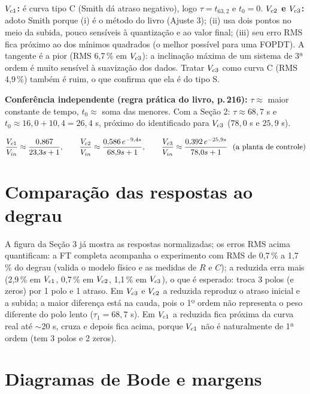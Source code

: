 \begin{just}\textbf{$V_{c1}$:} é curva tipo C (Smith dá atraso negativo), logo $\tau=t_{63,2}$ e $t_0=0$. \textbf{$V_{c2}$ e $V_{c3}$:} adoto Smith porque (i) é o método do livro (Ajuste 3); (ii) usa dois pontos no meio da subida, pouco sensíveis à quantização e ao valor final; (iii) seu erro RMS fica próximo ao dos mínimos quadrados (o melhor possível para uma FOPDT). A tangente é a pior (RMS 6,7\,\% em $V_{c3}$): a inclinação máxima de um sistema de 3ª ordem é muito sensível à suavização dos dados. Tratar $V_{c3}$ como curva C (RMS 4,9\,\%) também é ruim, o que confirma que ela é do tipo S.\end{just}
\textbf{Conferência independente (regra prática do livro, p.\,216):} $\tau\approx$ maior constante de tempo, $t_0\approx$ soma das menores. Com a Seção 2: $\tau\approx68{,}7$ s e $t_0\approx16{,}0+10{,}4=26{,}4$ s, próximo do identificado para $V_{c3}$ ($78{,}0$ s e $25{,}9$ s).
\begin{res}
\[
\frac{\Vc1}{\Vin}\approx\frac{0{,}867}{23{,}3s+1},\qquad
\frac{\Vc2}{\Vin}\approx\frac{0{,}586\,e^{-9{,}4s}}{68{,}9s+1},\qquad
\frac{\Vc3}{\Vin}\approx\frac{0{,}392\,e^{-25{,}9s}}{78{,}0s+1}\ \ \text{(a planta de controle)}
\]
\end{res}

\section{Comparação das respostas ao degrau}
A figura da Seção 3 já mostra as respostas normalizadas; os erros RMS acima quantificam: a FT completa acompanha o experimento com RMS de 0,7\,\% a 1,7\,\% do degrau (valida o modelo físico e as medidas de $R$ e $C$); a reduzida erra mais (2,9\,\% em $V_{c1}$, 0,7\,\% em $V_{c2}$, 1,1\,\% em $V_{c3}$), o que é esperado: troca 3 polos (e zeros) por 1 polo e 1 atraso. Em $V_{c3}$ e $V_{c2}$ a reduzida reproduz o atraso inicial e a subida; a maior diferença está na cauda, pois o 1º ordem não representa o peso diferente do polo lento ($\tau_1=68{,}7$ s). Em $V_{c1}$ a reduzida fica próxima da curva real até $\sim$20 s, cruza e depois fica acima, porque $V_{c1}$ não é naturalmente de 1ª ordem (tem 3 polos e 2 zeros).

\section{Diagramas de Bode e margens}
